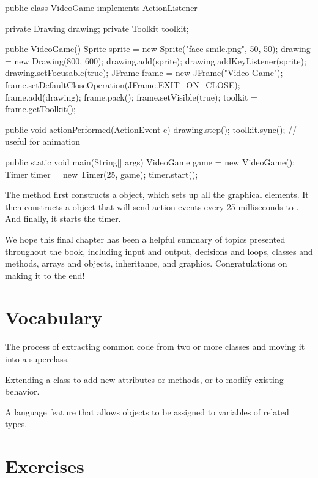 \begin{code}
public class VideoGame implements ActionListener {
    private Drawing drawing;
    private Toolkit toolkit;

    public VideoGame() {
        Sprite sprite = new Sprite("face-smile.png", 50, 50);
        drawing = new Drawing(800, 600);
        drawing.add(sprite);
        drawing.addKeyListener(sprite);
        drawing.setFocusable(true);
        JFrame frame = new JFrame("Video Game");
        frame.setDefaultCloseOperation(JFrame.EXIT_ON_CLOSE);
        frame.add(drawing);
        frame.pack();
        frame.setVisible(true);
        toolkit = frame.getToolkit();
    }

    public void actionPerformed(ActionEvent e) {
        drawing.step();
        toolkit.sync();  // useful for animation
    }

    public static void main(String[] args) {
        VideoGame game = new VideoGame();
        Timer timer = new Timer(25, game);
        timer.start();
    }
}
\end{code}

The  method first constructs a  object, which sets up all the graphical elements.
It then constructs a  object that will send action events every 25 milliseconds to .
And finally, it starts the timer.

We hope this final chapter has been a helpful summary of topics presented throughout the book, including input and output, decisions and loops, classes and methods, arrays and objects, inheritance, and graphics.
Congratulations on making it to the end!


\section{Vocabulary}

\begin{description}

The process of extracting common code from two or more classes and moving it into a superclass.

Extending a class to add new attributes or methods, or to modify existing behavior.

A language feature that allows objects to be assigned to variables of related types.

\end{description}


\section{Exercises}

